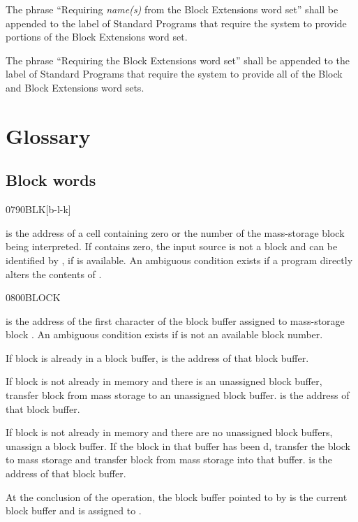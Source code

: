 The phrase ``Requiring \emph{name(s)} from the Block Extensions
word set'' shall be appended to the label of Standard Programs
that require the system to provide portions of the Block Extensions
word set.

The phrase ``Requiring the Block Extensions word set'' shall be
appended to the label of Standard Programs that require the system
to provide all of the Block and Block Extensions word sets.


\section{Glossary} %

\subsection{Block words} %

\begin{worddef}{0790}{BLK}[b-l-k]
\item {}

	 is the address of a cell containing zero or the
	number of the mass-storage block being interpreted. If
	 contains zero, the input source is not a block and
	can be identified by , if
	 is available. An ambiguous condition
	exists if a program directly alters the contents of .

\end{worddef}


\begin{worddef}{0800}{BLOCK}
\item {}

	 is the address of the first character of the
	block buffer assigned to mass-storage block . An
	ambiguous condition exists if  is not an available
	block number.

	If block  is already in a block buffer, 
	is the address of that block buffer.

	If block  is not already in memory and there is an
	unassigned block buffer, transfer block  from mass
	storage to an unassigned block buffer.  is the
	address of that block buffer.

	If block  is not already in memory and there are no
	unassigned block buffers, unassign a block buffer. If the block
	in that buffer has been d, transfer the block to
	mass storage and transfer block  from mass storage into
	that buffer.  is the address of that block buffer.

	At the conclusion of the operation, the block buffer pointed to
	by  is the current block buffer and is assigned to
	.
\end{worddef}


